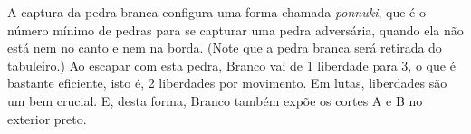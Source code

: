 \documentclass{book}
\newcommand{\setCoords}[1]{
  \pgfmathsetmacro{\x}{\stringToCoordX{#1} - 1}
  \pgfmathsetmacro{\y}{\stringToCoordY{#1} - 1}
}
\newcommand{\drawStoneFromSgfCoords}[2]{%
  \setCoords{#2}
  
  \pgfmathsetmacro{\stoneRadius}{\step * \ifStrEq{black}{#1}{0.99}{0.91} / 2}
  \pgfmathsetmacro{\outlineWidth}{\step * 1.15}

  \draw[
    draw = \UseName{not#1},
    fill = #1,
    minimum size = \step * 1cm,
    line width = \outlineWidth
  ]
    (\x * \step, \y * \step)
    circle [radius = \stoneRadius];
}
\newcommand{\drawMoveFromSgfCoords}[2]{
  \expandafter\xdef\csname thecolorat#2\endcsname{#1}%
  \drawStoneFromSgfCoords{#1}{#2}
  \textLabel{#1}{#2}{\themoveCounter}

  \stepMoveCounter
}
\newcounter{moveCounter}
\newcommand{\stepMoveCounter}{
  \stepcounter{moveCounter}
}
\newcommand\StoneColor[1]{%
  \ifcsname thecolorat#1\endcsname
    \csname thecolorat#1\endcsname
  \else
    white%
  \fi
}
\newcommand{\textLabel}[3]{%
  \setCoords{#2}%
  \draw (\x * \step, \y * \step) 
  node[
    color = -\StoneColor{#2},
    fill = \StoneColor{#2},
    inner sep=1pt,
    font  = \small\sffamily
  ] {#3};
}
\newcommand{\crossLabel}[2]{
  \setCoords{#2}
  \draw (\x * \step, \y * \step) 
  node[
    color = -\StoneColor{#2},
    fill = \StoneColor{#2},
    inner sep=1pt
  ] {$\times$};
}
\newcommand{\triangleLabel}[2]{
  \setCoords{#2}
  \draw (\x * \step, \y * \step) 
    node[
      isosceles triangle,
      draw                          = #1,
      line width                    = 0.5mm,
      color                         = -\StoneColor{#2},
      fill                          = -\StoneColor{#2},
      minimum height                = \step * 10,
      minimum width                 = \step * 10,
      rotate                        = 90,
      isosceles triangle apex angle = 60,
      inner sep                     = 0pt,
    ] {};
}
\newcommand{\squareLabel}[2]{
  \setCoords{#2}

  \draw (\x * \step, \y * \step) 
    node[
      draw         = #1,
      line width   = 0.5mm,
      color        = -\StoneColor{#2},
      fill         = -\StoneColor{#2},
      minimum size = \step * 10,
      inner sep    = 0pt,
    ] {};
}
\newcommand{\circleLabel}[2]{
  \setCoords{#2}

  \draw[
    draw         = #1,
    line width   = 0.5mm,
    color        = -\StoneColor{#2},
    fill         = -\StoneColor{#2},
    inner sep    = 0pt,
  ] (\x * \step, \y * \step) 
    circle[radius = \step / 4];
}
\newcommand{\parseSgf}[1]{%
  \setsepchar{(||)/;/]/[/:}%
  \readlist*\Z{#1}%

  \foreachitem \Branch \in \Z[]{%
  \foreachitem \Group \in \Z[\Branchcnt]{%
    \foreachitem \Key \in \Z[\Branchcnt, \Groupcnt]{%
     \if\relax\Key\relax%
     \else
      \itemtomacro\Z[\Branchcnt, \Groupcnt, \Keycnt, 1]\KeyName
      \if\relax\KeyName\relax%
        \let\KeyName\MostRecentKeyname
      \else
        \xdef\MostRecentKeyname{\KeyName}%
      \fi
      \itemtomacro\Z[\Branchcnt, \Groupcnt, \Keycnt, 2, 1]\KeyValue

      \edef\tmp{{\csname thecolorof\KeyName\endcsname}{\KeyValue}}%

      \if\Keytypeof\KeyName M
        \expandafter\drawMoveFromSgfCoords\tmp
      \fi
      \if\Keytypeof\KeyName A
        \expandafter\drawStoneFromSgfCoords\tmp
      \fi
      \if\Keytypeof\KeyName K
        \expandafter\crossLabel\tmp
      \fi
      \if\Keytypeof\KeyName C
        \expandafter\circleLabel\tmp
      \fi
      \if\Keytypeof\KeyName T
        \expandafter\triangleLabel\tmp
      \fi
      \if\Keytypeof\KeyName S
        \expandafter\squareLabel\tmp
      \fi
      \if\Keytypeof\KeyName L
        \expandafter\textLabel\tmp{\Z[\Branchcnt, \Groupcnt, \Keycnt, 2, 2]} 
      \fi
     \fi
    }
  }%
  }%
}
\newcommand{\calculateStep}{
  \pgfmathsetmacro{\step}{\boardDimension / (\boardSize - 1)} %
}
\newcommand{\goGrid}[1][]{
  \pgfkeys{/phili/goGrid/.cd, #1}

  \calculateStep

  \draw[step=\step] (0, 0) grid
    (\boardDimension, \boardDimension);
  
  \boardOutline{\boardDimension}

  \drawHoshis
}
\newcommand{\boardOutline}[1]{
  \draw[step       = #1,
        line width = \boardOutlineWidth,
        line cap   = rect] 
    (0, 0) grid (#1, #1);
}
\newcommand{\drawHoshis}{
  \tikzmath{
    \hoshiRadius = \step * 0.125;
    \centerHoshi = ceil(\boardSize / 2);
    int \hoshiDistance;
    if \boardSize<12 then {
      \hoshiDistance = 3;
    } else {
      \hoshiDistance = 4;
    };
    \hoshiComplement = \boardSize - \hoshiDistance + 1;
  }

  \drawCenterHoshi
  \drawCornerHoshis
  \ifnum\boardSize>6\relax
    \drawCornerHoshis
  \fi
  \ifthenelse{\isodd{\boardSize}}{
    \ifnum\boardSize>13\relax
      \drawSideHoshis
    \fi
  }{}
}
\newcommand{\drawCenterHoshi}{
  \pgfmathsetmacro{\centerHoshiCoord}{(\centerHoshi - 1) * \step}

  \filldraw (\centerHoshiCoord, \centerHoshiCoord)
    circle [radius=\hoshiRadius];
}
\newcommand{\drawCornerHoshis}{
  \def\cornerHoshisArray{%
    {\hoshiDistance, \hoshiDistance},%
    {\hoshiComplement, \hoshiDistance},%
    {\hoshiDistance, \hoshiComplement },%
    {\hoshiComplement, \hoshiComplement}%
  }

  \loopOverHoshis{\cornerHoshisArray}
}
\newcommand{\loopOverHoshis}[1]{
  \foreach \sloc in #1 {
    \pgfmathsetmacro{\hoshiCoordX}{\step * ({\sloc}[0] - 1)}
    \pgfmathsetmacro{\hoshiCoordY}{\step * ({\sloc}[1] - 1)}

    \filldraw (\hoshiCoordX, \hoshiCoordY)
      circle [radius=\hoshiRadius];
  }
}
\newcommand{\drawSideHoshis}{
  \def\sideHoshisArray{%
    {\hoshiDistance, \centerHoshi},%
    {\centerHoshi, \hoshiComplement},%
    {\centerHoshi, \hoshiDistance},%
    {\hoshiComplement, \centerHoshi}%
  }    

  \loopOverHoshis{\sideHoshisArray}
}
\newcommand\parseSgfFile[1]{%
  \CatchFileDef{\mysgf}{#1}{}%
  \parseSgf{\mysgf}%
}
\newcommand{\partialBoardClipping}{
  \ifthenelse{
    \equal{\horClipStart}{-1} \AND
    \equal{\horClipEnd}{-1} \AND
    \equal{\verClipStart}{-1} \AND
    \equal{\verClipEnd}{-1}
  }{}{
    \tikzmath{
      \horStart = (-1.5 + \horClipStart) * \step;
      \horEnd = (\horClipEnd) * \step;
      \verStart = (-1.5 + \verClipStart) * \step;
      \verEnd = (\verClipEnd) * \step;
    }

    \clip (\horStart, \verStart) rectangle 
          (\horEnd, \verEnd);
  }
}
\newenvironment{goban}[1][]{
  \pgfkeys{/phili/goban/.cd, #1}

  \begin{tikzpicture}[scale = \scale, transform shape]
    \calculateStep

    \partialBoardClipping

    \goGrid
}{
    \setcounter{moveCounter}{1}
  \end{tikzpicture}
}
\begin{document}


    
  


  \problemDiagrams
  \answerDiagrams%
    {A captura da pedra branca configura uma forma chamada \emph{ponnuki}, que é o número mínimo de pedras para se capturar uma pedra adversária, quando ela não está nem no canto e nem na borda. (Note que a pedra branca será retirada do tabuleiro.)}%
    {Ao escapar com esta pedra, Branco vai de 1 liberdade para 3, o que é bastante eficiente, isto é, 2 liberdades por movimento. Em lutas, liberdades são um bem crucial. E, desta forma, Branco também expõe os cortes \textsf{A} e \textsf{B} no exterior preto.}%
\end{document}
